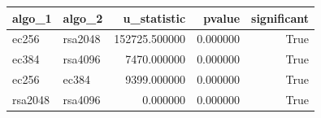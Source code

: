 \begin{tabular}{llrrr}
\toprule
algo_1 & algo_2 & u_statistic & pvalue & significant \\
\midrule
ec256 & rsa2048 & 152725.500000 & 0.000000 & True \\
ec384 & rsa4096 & 7470.000000 & 0.000000 & True \\
ec256 & ec384 & 9399.000000 & 0.000000 & True \\
rsa2048 & rsa4096 & 0.000000 & 0.000000 & True \\
\bottomrule
\end{tabular}
